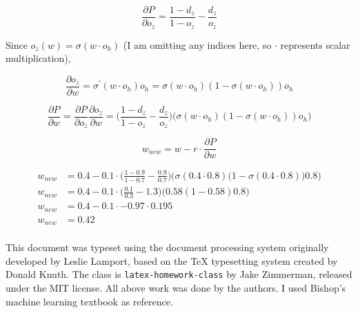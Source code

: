 \documentclass[11pt,largemargins, anonymous]{homework}
\begin{document}
\question

\begin{alphaparts}
    \questionpart

    \[ \frac{\partial P}{\partial o_z} = \frac{1 - d_z}{1 - o_z} - \frac{d_z}{o_z}  \]

    \questionpart

    Since $o_z(w) = \sigma (w \cdot o_h)$ (I am omitting any indices here, so $\cdot$ represents scalar multiplication),

    \[ \frac{\partial o_z}{\partial w} = \sigma^\prime (w \cdot o_h) o_h = \sigma (w \cdot o_h ) (1 - \sigma (w \cdot o_h)) o_h \]

    \questionpart

    \[ \frac{\partial P}{\partial w} = \frac{\partial P}{\partial o_z} \frac{\partial o_z}{\partial w} = \bigg( \frac{1 - d_z}{1 - o_z} - \frac{d_z}{o_z} \bigg) \bigg( \sigma (w \cdot o_h ) (1 - \sigma (w \cdot o_h)) o_h \bigg) \]

    \questionpart

    \[ w_{new} = w - r \cdot \frac{\partial P}{\partial w} \]

    \questionpart

    \begin{align*}
        w_{new} &= 0.4 - 0.1 \cdot \bigg( \frac{1 - 0.9}{1 - 0.7} - \frac{0.9}{0.7} \bigg) \bigg( \sigma (0.4 \cdot 0.8 )  \Big( 1 - \sigma (0.4 \cdot 0.8 ) \Big) 0.8 \bigg) \\
        w_{new} &= 0.4 - 0.1 \cdot \bigg( \frac{0.1}{0.3} - 1.3 \bigg) \bigg( 0.58 (1 - 0.58) 0.8 \bigg) \\
        w_{new} &= 0.4 - 0.1 \cdot -0.97 \cdot 0.195 \\
        w_{new} &= 0.42 \\
    \end{align*}

\end{alphaparts}

\begin{colophon}
    This document was typeset using the \LaTeXe{} document processing system
    originally developed by Leslie Lamport, based on the \TeX{} typesetting system
    created by Donald Knuth.
    The class is \texttt{latex-homework-class} by Jake Zimmerman,
    released under the MIT license.
    All above work was done by the authors.
    I used Bishop's machine learning textbook as reference.
\end{colophon}
\end{document}
